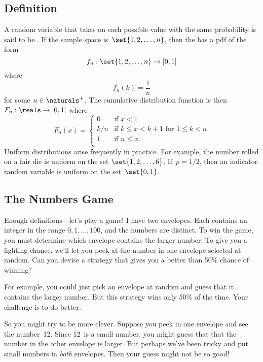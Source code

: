 \subsection{Definition}

A random variable that takes on each possible value with the same
probability is said to be .  If the sample space
is~$\set{1, 2, \dots, n}$, then the  has a
pdf of the form
\begin{equation*}
    f_n : \set{1, 2, \dots, n} \to [0,1]
\end{equation*}
where
\begin{equation*}
    f_n(k) = \frac{1}{n}
\end{equation*}
for some $n \in \naturals^+$.  The cumulative distribution function
is then $F_n: \reals \to [0, 1]$ where
\begin{equation*}
F_n(x) =
    \begin{cases}
        0 & \text{if $x < 1$} \\
        k/n & \text{if $k \le x < k + 1$ for $1 \le k < n$} \\
        1 & \text{if $n \le x$}. \\
    \end{cases}
\end{equation*}
Uniform distributions arise frequently in practice.  For example, the
number rolled on a fair die is uniform on the set $\set{1, 2, \dots,
  6}$.  If~$p = 1/2$, then an indicator random variable is uniform on
the set~$\set{0, 1}$.

\subsection{The Numbers Game}\label{bigger_number_subsec}

Enough definitions---let's play a game!  I have two envelopes.  Each
contains an integer in the range $0, 1, \dots, 100$, and the numbers
are distinct.  To win the game, you must determine which envelope
contains the larger number.  To give you a fighting chance, we'll let
you peek at the number in one envelope selected at random.  Can you
devise a strategy that gives you a better than 50\% chance of winning?

For example, you could just pick an envelope at random and guess that
it contains the larger number.  But this strategy wins only 50\% of
the time.  Your challenge is to do better.

So you might try to be more clever.  Suppose you peek in one envelope
and see the number~12.  Since 12~is a small number, you might guess
that that the number in the other envelope is larger.  But perhaps
we've been tricky and put small numbers in \emph{both} envelopes.
Then your guess might not be so good!


